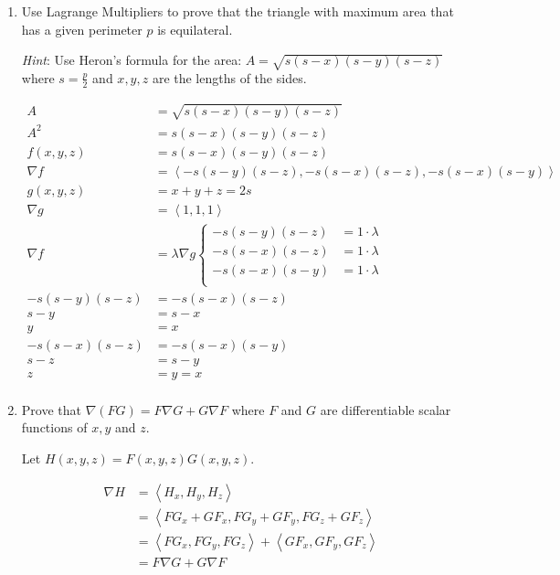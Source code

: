\documentclass[11pt]{article}
\begin{document}
\begin{enumerate}
\item Use Lagrange Multipliers to prove that the triangle with maximum area that
  has a given perimeter \(p\) is equilateral.

  \textit{Hint}: Use Heron's formula for the area:
  \(A = \sqrt{s(s - x)(s - y)(s - z)}\) where \(s = \frac{p}{2}\) and
  \(x, y, z\) are the lengths of the sides.

  \begin{align*}
    A &= \sqrt{s(s - x)(s - y)(s - z)} \\
    A^2 &= s(s - x)(s - y)(s - z) \\
    f(x, y, z) &= s(s - x)(s - y)(s - z) \\
    \nabla f &= \left< -s(s - y)(s - z), -s(s - x)(s - z), -s(s - x)(s - y) \right> \\
    g(x, y, z) &= x + y + z = 2s \\
    \nabla g &= \left< 1, 1, 1 \right> \\
    \nabla f &= \lambda\nabla g
               \begin{cases}
                 -s(s - y)(s - z) &= 1 \cdot \lambda \\
                 -s(s - x)(s - z) &= 1 \cdot \lambda \\
                 -s(s - x)(s - y) &= 1 \cdot \lambda \\
               \end{cases} \\
    -s(s - y)(s - z) &= -s(s - x)(s - z) \\
    s - y &= s - x \\
    y &= x \\
    -s(s - x)(s - z) &= -s(s - x)(s - y) \\
    s - z &= s - y \\
    z &= y = x \\
  \end{align*}

\item Prove that \(\nabla (FG) = F \nabla G + G \nabla F\) where \(F\) and
  \(G\) are differentiable scalar functions of \(x, y\) and \(z\).

  Let \(H(x, y, z) = F(x, y, z) G(x, y, z)\).

  \begin{align*}
    \nabla H &= \left< H_x, H_y, H_z \right> \\
             &= \left< FG_x + GF_x, FG_y + GF_y, FG_z + GF_z \right> \\
             &= \left< FG_x, FG_y, FG_z \right> + \left< GF_x, GF_y, GF_z \right> \\
             &= F \nabla G + G \nabla F
  \end{align*}


\end{enumerate}
\end{document}
